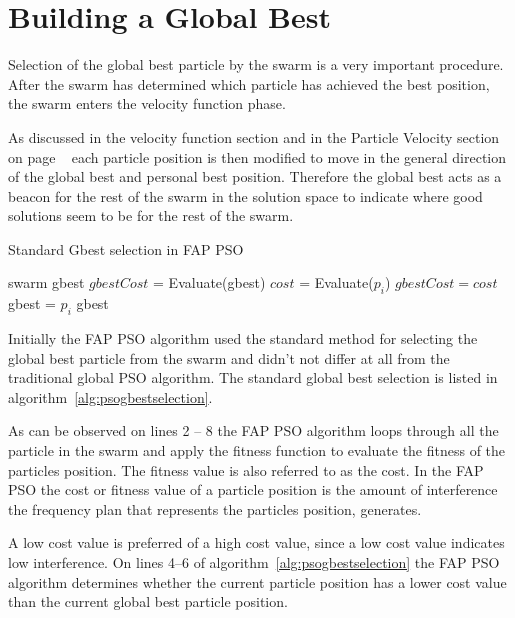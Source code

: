 \section{Building a Global Best}
\label{sec:buildglobalbest}
Selection of the global best particle by the swarm is a very important procedure. After the swarm has determined which particle has achieved the best position, the swarm enters the velocity function phase. 

As discussed in the velocity function section and in the Particle Velocity section on page ~\pageref{sec:particleVelocity} each particle position is then modified to move in the general direction of the global best and personal best position. Therefore the global best acts as a beacon for the rest of the swarm in the solution space to indicate where good solutions seem to be for the rest of the swarm.

\begin{algorithm}
\caption{Standard Gbest selection in FAP PSO}
\label{alg:psogbestselection}
\begin{algorithmic}[1]
\REQUIRE swarm
\REQUIRE gbest
\STATE $gbestCost$ = Evaluate(gbest)
	\STATE $cost$ = Evaluate($p_i$)
		\STATE $gbestCost = cost$
		\STATE gbest = $p_i$
	\ENDIF
\ENDFOR
\RETURN gbest
\end{algorithmic}
\end{algorithm}

Initially the FAP PSO algorithm used the standard method for selecting the global best particle from the swarm and didn't not differ at all from the traditional global PSO algorithm. The standard global best selection is listed in algorithm~\ref{alg:psogbestselection}. 

As can be observed on lines 2 -- 8 the FAP PSO algorithm loops through all the particle in the swarm and apply the fitness function to evaluate the fitness of the particles position. The fitness value is also referred to as the cost. In the FAP PSO the cost or fitness value of a particle position is the amount of interference the frequency plan that represents the particles position, generates.

A low cost value is preferred of a high cost value, since a low cost value indicates low interference. On lines 4--6 of algorithm~\ref{alg:psogbestselection} the FAP PSO algorithm determines whether the current particle position has a lower cost value than the current global best particle position.

